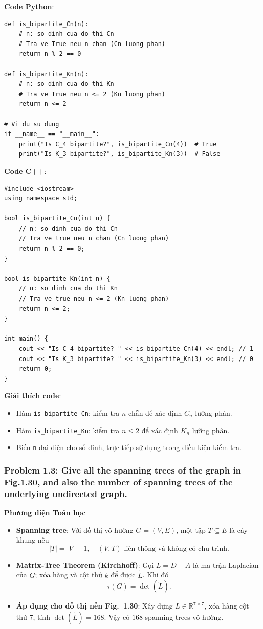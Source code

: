 \documentclass[a4paper,12pt]{article}
\begin{document}
\textbf{Code Python}:
\lstset{language=Python}
\begin{lstlisting}
def is_bipartite_Cn(n):
    # n: so dinh cua do thi Cn
    # Tra ve True neu n chan (Cn luong phan)
    return n % 2 == 0

def is_bipartite_Kn(n):
    # n: so dinh cua do thi Kn
    # Tra ve True neu n <= 2 (Kn luong phan)
    return n <= 2

# Vi du su dung
if __name__ == "__main__":
    print("Is C_4 bipartite?", is_bipartite_Cn(4))  # True
    print("Is K_3 bipartite?", is_bipartite_Kn(3))  # False
\end{lstlisting}

\bigskip
\textbf{Code C++}:
\lstset{language=C++}
\begin{lstlisting}
#include <iostream>
using namespace std;

bool is_bipartite_Cn(int n) {
    // n: so dinh cua do thi Cn
    // Tra ve true neu n chan (Cn luong phan)
    return n % 2 == 0;
}

bool is_bipartite_Kn(int n) {
    // n: so dinh cua do thi Kn
    // Tra ve true neu n <= 2 (Kn luong phan)
    return n <= 2;
}

int main() {
    cout << "Is C_4 bipartite? " << is_bipartite_Cn(4) << endl; // 1
    cout << "Is K_3 bipartite? " << is_bipartite_Kn(3) << endl; // 0
    return 0;
}
\end{lstlisting}

\bigskip
\textbf{Giải thích code}:
\begin{itemize}
    \item Hàm \texttt{is\_bipartite\_Cn}: kiểm tra \(n\) chẵn để xác định \(C_n\) lưỡng phân.
    \item Hàm \texttt{is\_bipartite\_Kn}: kiểm tra \(n \le 2\) để xác định \(K_n\) lưỡng phân.
    \item Biến \texttt{n} đại diện cho số đỉnh, trực tiếp sử dụng trong điều kiện kiểm tra.
\end{itemize}

\subsubsection{Problem 1.3: Give all the spanning trees of the graph in Fig.1.30, and also the number of spanning trees of the underlying undirected graph.}

\textbf{Phương diện Toán học}
\begin{itemize}
  \item \textbf{Spanning tree}: Với đồ thị vô hướng $G=(V,E)$, một tập $T\subseteq E$ là cây khung nếu
  \[
    |T|=|V|-1,\quad (V,T)\text{ liên thông và không có chu trình.}
  \]
  \item \textbf{Matrix‐Tree Theorem (Kirchhoff)}: Gọi $L=D-A$ là ma trận Laplacian của $G$; xóa hàng và cột thứ $k$ để được $\widetilde L$. Khi đó
  \[
    \tau(G)=\det(\widetilde L).
  \]
  \item \textbf{Áp dụng cho đồ thị nền Fig.~1.30}: Xây dựng $L\in\mathbb R^{7\times7}$, xóa hàng cột thứ 7, tính $\det(\widetilde L)=168$. Vậy có $\boxed{168}$ spanning‐trees vô hướng.
\end{itemize}
\end{document}
